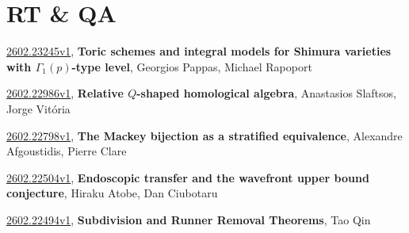 \documentclass[9pt, a4paper]{article}
\theoremstyle{plain}
\theoremstyle{definition}
\theoremstyle{remark}
\newcommand{\arxiv}[3]{\href{https://arxiv.org/abs/#1}{#1}, \textbf{\textcolor{arxivblue}{#2}}, #3}
\begin{document}
\section{RT \& QA}
\arxiv{2602.23245v1}{Toric schemes and integral models for Shimura varieties with $Γ_1(p)$-type level}{Georgios Pappas, Michael Rapoport}

\arxiv{2602.22986v1}{Relative $Q$-shaped homological algebra}{Anastasios Slaftsos, Jorge Vitória}

\arxiv{2602.22798v1}{The Mackey bijection as a stratified equivalence}{Alexandre Afgoustidis, Pierre Clare}

\arxiv{2602.22504v1}{Endoscopic transfer and the wavefront upper bound conjecture}{Hiraku Atobe, Dan Ciubotaru}

\arxiv{2602.22494v1}{Subdivision and Runner Removal Theorems}{Tao Qin}

\end{document}
